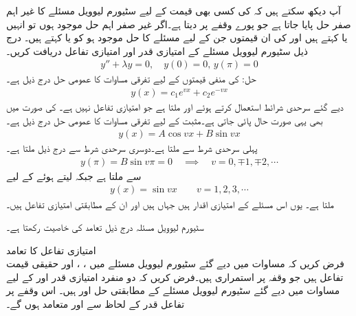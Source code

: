 آپ دیکھ سکتے ہیں کہ  کی کسی بھی قیمت کے لیے سٹیورم لیوویل مسئلے کا غیر اہم صفر حل  پایا جاتا ہے جو پورے وقفے پر  دیتا ہے۔اگر غیر صفر اہم حل   موجود ہوں تو انہیں  یا  کہتے ہیں اور  کی ان قیمتوں جن کے لیے مسئلے کا حل موجود ہو کو  یا  کہتے ہیں۔
درج ذیل سٹیورم لیوویل مسئلے کے امتیازی قدر اور امتیازی تفاعل دریافت کریں۔
\begin{align*}
y''+\lambda y=0,\quad y(0)=0,\, y(\pi)=0
\end{align*}
حل: کی منفی قیمتوں  کے لیے تفرقی مساوات کا عمومی حل درج ذیل ہے۔
\begin{align*}
y(x)=c_1e^{vx}+c_2e^{-vx}
\end{align*}
دیے گئے سرحدی شرائط استعمال کرتے ہوئے  اور  ملتا ہے جو امتیازی تفاعل نہیں ہے۔ کی صورت میں بھی یہی صورت حال پائی جاتی ہے۔مثبت  کے لیے تفرقی مساوات کا عمومی حل درج ذیل ہے۔
\begin{align*}
y(x)=A\cos vx+B\sin vx
\end{align*}
پہلی سرحدی شرط سے   ملتا ہے۔دوسری سرحدی شرط سے درج ذیل ملتا ہے۔
\begin{align*}
y(\pi)=B\sin v \pi=0 \quad \implies \quad v=0, \mp1, \mp2,\cdots
\end{align*}
 سے  ملتا ہے جبکہ  لیتے ہوئے  کے لیے 
\begin{align*}
y(x)=\sin vx\quad \quad v=1,2,3,\cdots
\end{align*}
ملتا ہے۔ یوں اس مسئلے کے امتیازی اقدار  ہیں جہاں  ہیں اور ان کے مطابقتی امتیازی تفاعل  ہیں۔
 

سٹیورم لیوویل مسئلہ  درج ذیل تعامد کی خاصیت رکھتا ہے۔ 

\quad امتیازی تفاعل کا  تعامد\\
فرض کریں کہ مساوات  میں دیے گئے سٹیورم لیوویل مسئلے  میں  ، ،  اور   حقیقی قیمت تفاعل ہیں جو وقفہ  پر استمراری ہیں۔فرض کریں کہ دو منفرد امتیازی قدر  اور  کے لیے مساوات  میں دیے گئے سٹیورم لیوویل مسئلے  کے مطابقتی حل    اور   ہیں۔ اس وقفے پر تفاعل قدر  کے لحاظ سے  اور  متعامد ہوں گے۔

